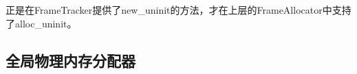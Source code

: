 \documentclass[12pt, a4paper]{ctexart}
\begin{document}
正是在FrameTracker提供了new\_uninit的方法，才在上层的FrameAllocator中支持了alloc\_uninit。

	\subsection{全局物理内存分配器}
	
\end{document}
